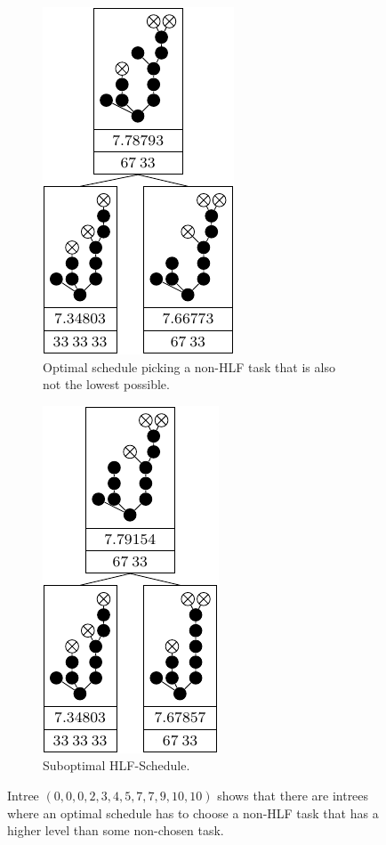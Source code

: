 \begin{figure}[ht]
  \centering
  \begin{subfigure}{.45\textwidth}
    \centering
    \includegraphics{p3/only_high_or_low/00023457791010_opt.pdf}
    \caption{Optimal schedule picking a non-HLF task that is also not the lowest possible.}
  \end{subfigure}
  \quad
  \begin{subfigure}{.45\textwidth}
    \centering
    \includegraphics{p3/only_high_or_low/00023457791010_subopt.pdf}
    \caption{Suboptimal HLF-Schedule.}
  \end{subfigure}
  \caption{Intree $(0,0,0,2,3,4,5,7,7,9,10,10)$ shows that there are intrees where an optimal schedule has to choose a non-HLF task that has a higher level than some non-chosen task.}
  \label{fig:only-high-or-low-not-optimal}
\end{figure}

